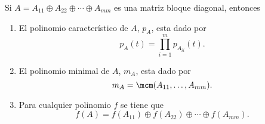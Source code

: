 
\renewcommand{\labelenumi}{\upshape\scshape\roman{enumi}.}
\newcommand{\bigzero}{\mbox{\normalfont\LARGE $0$}} 

	\begin{teo}
		Si $A=A_{11}\oplus A_{22}\oplus\cdots\oplus A_{mm}$ es una matriz bloque diagonal, entonces
		\begin{enumerate}
			\item El polinomio característico de $A$, $p_A$, esta dado por
			\[ p_A(t) = \prod_{i=1}^{m} p_{A_{ii}}(t). \]
			\item El polinomio minimal de $A$, $m_A$, esta dado por
			\[ m_A = \mcm(A_{11},\dots,A_{mm}).  \]
			\item Para cualquier polinomio $f$ se tiene que
			\[ f(A) = f(A_{11})\oplus f(A_{22})\oplus\cdots\oplus f(A_{mm}). \]
		\end{enumerate}
	\end{teo}
